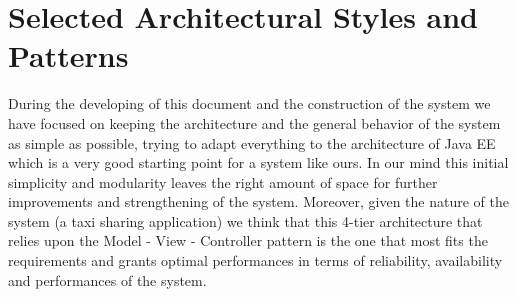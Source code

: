 \section{Selected Architectural Styles and Patterns}
During the developing of this document and the construction of the system we have focused on keeping the architecture and the general behavior of the system as simple as possible, trying to adapt everything to the architecture of Java EE which is a very good starting point for a system like ours. In our mind this initial simplicity and modularity leaves the right amount of space for further improvements and strengthening of the system. Moreover, given the nature of the system (a taxi sharing application) we think that this 4-tier architecture that relies upon the Model - View - Controller pattern is the one that most fits the requirements and grants optimal performances in terms of reliability, availability and performances of the system.